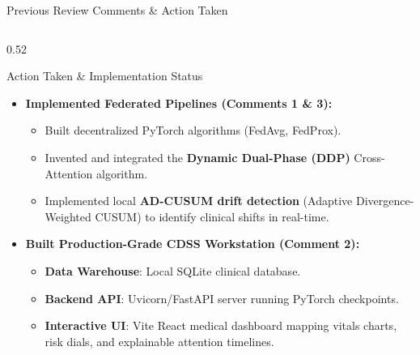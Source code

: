 \documentclass[aspectratio=169, 11pt]{beamer}
\begin{document}
\begin{frame}{Previous Review Comments \& Action Taken}
\begin{columns}[t]
        \begin{column}{0.52\textwidth}
            \begin{block}{Action Taken \& Implementation Status}
                \scriptsize
                \begin{itemize}
                    \item \textbf{Implemented Federated Pipelines (Comments 1 \& 3):}
                    \begin{itemize}
                        \scriptsize
                        \item Built decentralized PyTorch algorithms (FedAvg, FedProx).
                        \item Invented and integrated the \textbf{Dynamic Dual-Phase (DDP)} Cross-Attention algorithm.
                        \item Implemented local \textbf{AD-CUSUM drift detection} (Adaptive Divergence-Weighted CUSUM) to identify clinical shifts in real-time.
                    \end{itemize}
                    \vspace{0.2cm}
                    \item \textbf{Built Production-Grade CDSS Workstation (Comment 2):}
                    \begin{itemize}
                        \scriptsize
                        \item \textbf{Data Warehouse}: Local SQLite clinical database.
                        \item \textbf{Backend API}: Uvicorn/FastAPI server running PyTorch checkpoints.
                        \item \textbf{Interactive UI}: Vite React medical dashboard mapping vitals charts, risk dials, and explainable attention timelines.
                    \end{itemize}
                \end{itemize}
            \end{block}
        \end{column}
    \end{columns}
\end{frame}
\end{document}
